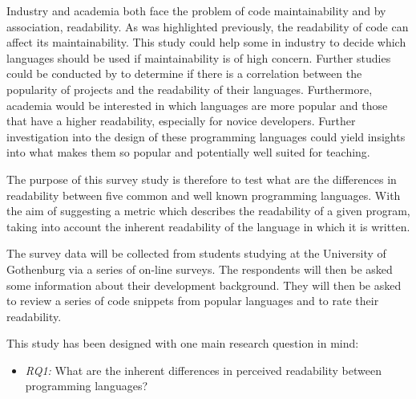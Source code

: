 \documentclass[times, 10pt,twocolumn]{Article}
\begin{document}


Industry and academia both face the problem of code maintainability and by association, readability. As was highlighted previously, the readability of code can affect its maintainability. This study could help some in industry to decide which languages should be used if maintainability is of high concern. Further studies could be conducted by to determine if there is a correlation between the popularity of projects and the readability of their languages. Furthermore, academia would be interested in which languages are more popular and those that have a higher readability, especially for novice developers. Further investigation into the design of these programming languages could yield insights into what makes them so popular and potentially well suited for teaching.

The purpose of this survey study is therefore to test what are the differences in readability between five common and well known programming languages. With the aim of suggesting a metric which describes the readability of a given program, taking into account the inherent readability of the language in which it is written.

The survey data will be collected from students studying at the University of Gothenburg via a series of on-line surveys. The respondents will then be asked some information about their development background. They will then be asked to review a series of code snippets from popular languages and to rate their readability. 

This study has been designed with one main research question in mind:
\begin{itemize}
\item \textit{RQ1:} What are the inherent differences in perceived readability between programming languages?
\end{itemize}
\end{document}
